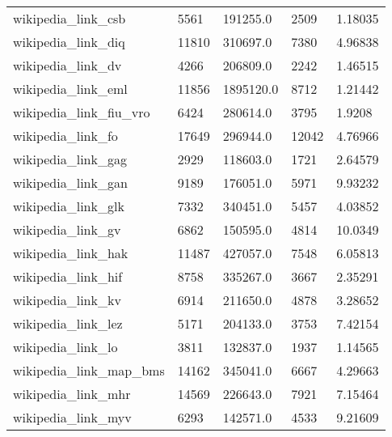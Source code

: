 \begin{longtable}{lllll}
 wikipedia\_link\_csb                                 & 5561       & 191255.0    & 2509  & 1.18035    \\
 wikipedia\_link\_diq                                 & 11810      & 310697.0    & 7380  & 4.96838    \\
 wikipedia\_link\_dv                                  & 4266       & 206809.0    & 2242  & 1.46515    \\
 wikipedia\_link\_eml                                 & 11856      & 1895120.0   & 8712  & 1.21442    \\
 wikipedia\_link\_fiu\_vro                             & 6424       & 280614.0    & 3795  & 1.9208     \\
 wikipedia\_link\_fo                                  & 17649      & 296944.0    & 12042 & 4.76966    \\
 wikipedia\_link\_gag                                 & 2929       & 118603.0    & 1721  & 2.64579    \\
 wikipedia\_link\_gan                                 & 9189       & 176051.0    & 5971  & 9.93232    \\
 wikipedia\_link\_glk                                 & 7332       & 340451.0    & 5457  & 4.03852    \\
 wikipedia\_link\_gv                                  & 6862       & 150595.0    & 4814  & 10.0349    \\
 wikipedia\_link\_hak                                 & 11487      & 427057.0    & 7548  & 6.05813    \\
 wikipedia\_link\_hif                                 & 8758       & 335267.0    & 3667  & 2.35291    \\
 wikipedia\_link\_kv                                  & 6914       & 211650.0    & 4878  & 3.28652    \\
 wikipedia\_link\_lez                                 & 5171       & 204133.0    & 3753  & 7.42154    \\
 wikipedia\_link\_lo                                  & 3811       & 132837.0    & 1937  & 1.14565    \\
 wikipedia\_link\_map\_bms                             & 14162      & 345041.0    & 6667  & 4.29663    \\
 wikipedia\_link\_mhr                                 & 14569      & 226643.0    & 7921  & 7.15464    \\
 wikipedia\_link\_myv                                 & 6293       & 142571.0    & 4533  & 9.21609    \\

\end{longtable}
